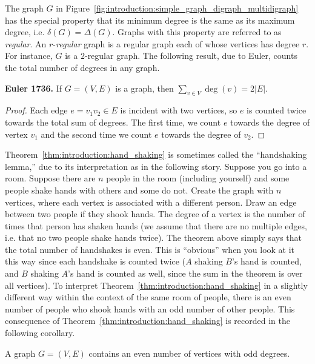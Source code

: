 The graph $G$ in
Figure~\ref{fig:introduction:simple_graph_digraph_multidigraph}
has the special property that its minimum degree is the same as its
maximum degree, i.e. $\delta(G) = \Delta(G)$. Graphs with this
property are referred to as
\emph{regular}. An
$r$-\emph{regular}
graph is a regular graph each of whose vertices has degree $r$. For
instance, $G$ is a $2$-regular graph. The following result, due to
Euler, counts the total number of degrees in any graph.

\begin{theorem}
\label{thm:introduction:degree_sum}
\label{thm:introduction:hand_shaking}
\textbf{Euler 1736.}
If $G = (V, E)$ is a graph, then $\sum_{v \in V} \deg(v) = 2 |E|$.
\end{theorem}

\begin{proof}
Each edge $e = v_1 v_2 \in E$ is incident with two vertices, so $e$ is
counted twice towards the total sum of degrees. The first time, we
count $e$ towards the degree of vertex $v_1$ and the second time we
count $e$ towards the degree of $v_2$.
\end{proof}

Theorem~\ref{thm:introduction:hand_shaking} is sometimes called the
``handshaking lemma,'' due to its interpretation as in the following
story. Suppose you go into a room. Suppose there are $n$ people in the
room (including yourself) and some people shake hands with others and
some do not. Create the graph with $n$ vertices, where each vertex is
associated with a different person. Draw an edge between two people if
they shook hands. The degree of a vertex is the number of times that
person has shaken hands (we assume that there are no multiple edges,
i.e. that no two people shake hands twice). The theorem above simply
says that the total number of handshakes is even. This is ``obvious''
when you look at it this way since each handshake is counted twice
($A$ shaking $B$'s hand is counted, and $B$ shaking $A$'s hand is
counted as well, since the sum in the theorem is over all
vertices). To interpret Theorem~\ref{thm:introduction:hand_shaking} in
a slightly different way within the context of the same room of
people, there is an even number of people who shook hands with an odd
number of other people. This consequence of
Theorem~\ref{thm:introduction:hand_shaking} is recorded in the
following corollary.

\begin{corollary}
\label{cor:introduction:even_num_vertices_odd_degree}
A graph $G = (V, E)$ contains an even number of vertices with odd
degrees.
\end{corollary}

